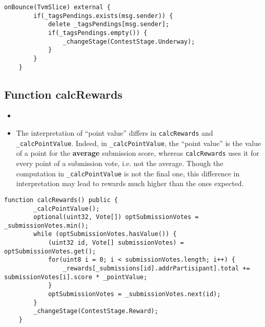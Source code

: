 \begin{lstlisting}[firstnumber=64]
    onBounce(TvmSlice) external {
        if(_tagsPendings.exists(msg.sender)) {
            delete _tagsPendings[msg.sender];
            if(_tagsPendings.empty()) {
                _changeStage(ContestStage.Underway);
            }
        }
    }
\end{lstlisting}

\subsection{Function calcRewards}

\begin{itemize}
\item {}
\item {} {The
  interpretation of ``point value'' differs in {\tt calcRewards} and
  {\tt \_calcPointValue}. Indeed, in {\tt \_calcPointValue}, the
  ``point value'' is the value of a point for the {\bf average}
  submission score, whereas {\tt calcRewards} uses it for every point
  of a submission vote, i.e. not the average. Though the computation
  in {\tt \_calcPointValue} is not the final one, this difference in
  interpretation may lead to rewards much higher than the ones
  expected.}
\end{itemize}

\begin{lstlisting}[firstnumber=175]
    function calcRewards() public {
        _calcPointValue();
        optional(uint32, Vote[]) optSubmissionVotes = _submissionVotes.min();
        while (optSubmissionVotes.hasValue()) {
            (uint32 id, Vote[] submissionVotes) = optSubmissionVotes.get();
            for(uint8 i = 0; i < submissionVotes.length; i++) {
                _rewards[_submissions[id].addrPartisipant].total += submissionVotes[i].score * _pointValue;
            }
            optSubmissionVotes = _submissionVotes.next(id);
        }
        _changeStage(ContestStage.Reward);
    }
\end{lstlisting}

